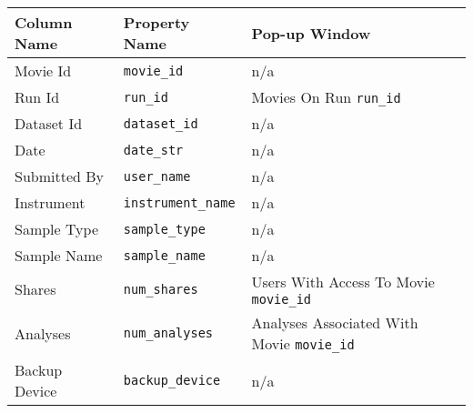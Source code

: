 \begin{tabularx}{\textwidth}{l|l|X}
\toprule
 Column Name   & Property Name   & Pop-up Window                           \\
\midrule
 Movie Id      & \texttt{movie\_id}        & n/a                                     \\
 Run Id        & \texttt{run\_id}          & Movies On Run \texttt{run\_id}                    \\
 Dataset Id    & \texttt{dataset\_id}      & n/a                                     \\
 Date          & \texttt{date\_str}        & n/a                                     \\
 Submitted By  & \texttt{user\_name}       & n/a                                     \\
 Instrument    & \texttt{instrument\_name} & n/a                                     \\
 Sample Type   & \texttt{sample\_type}     & n/a                                     \\
 Sample Name   & \texttt{sample\_name}     & n/a                                     \\
 Shares        & \texttt{num\_shares}      & Users With Access To Movie \texttt{movie\_id}     \\
 Analyses      & \texttt{num\_analyses}    & Analyses Associated With Movie \texttt{movie\_id} \\
 Backup Device & \texttt{backup\_device}   & n/a                                     \\
\bottomrule
\end{tabularx}